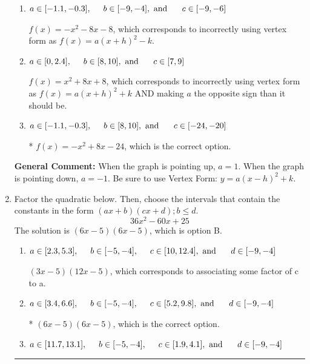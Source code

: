 \documentclass{extbook}[14pt]
\newcommand{\litem}[1]{\item #1

\rule{\textwidth}{0.4pt}}
\begin{document}
\begin{enumerate}
{\begin{enumerate}[label=\Alph*.]
$f(x)=x^{2} -8 x + 8$, which corresponds to making $a$ the opposite sign than it should be.
\item \( a \in [-1.1, -0.3], \hspace*{5mm} b \in [-9, -4], \text{ and } \hspace*{5mm} c \in [-9, -6] \)

$f(x)=-x^{2} -8 x -8$, which corresponds to incorrectly using vertex form as $f(x) = a(x+h)^2 - k$.
\item \( a \in [0, 2.4], \hspace*{5mm} b \in [8, 10], \text{ and } \hspace*{5mm} c \in [7, 9] \)

$f(x)=x^{2} +8 x + 8$, which corresponds to incorrectly using vertex form as $f(x) = a(x+h)^2+k$ AND making $a$ the opposite sign than it should be.
\item \( a \in [-1.1, -0.3], \hspace*{5mm} b \in [8, 10], \text{ and } \hspace*{5mm} c \in [-24, -20] \)

* $f(x)=-x^{2} +8 x -24$, which is the correct option.
\end{enumerate}

\textbf{General Comment:} When the graph is pointing up, $a=1$. When the graph is pointing down, $a=-1$. Be sure to use Vertex Form: $y = a(x-h)^2+k$.
}
\litem{
Factor the quadratic below. Then, choose the intervals that contain the constants in the form $(ax+b)(cx+d); b \leq d.$
\[ 36x^{2} -60 x + 25 \]The solution is \( (6x -5)(6x -5) \), which is option B.\begin{enumerate}[label=\Alph*.]
\item \( a \in [2.3, 5.3], \hspace*{5mm} b \in [-5, -4], \hspace*{5mm} c \in [10, 12.4], \text{ and } \hspace*{5mm} d \in [-9, -4] \)

 $(3x -5)(12x -5)$, which corresponds to associating some factor of c to a.
\item \( a \in [3.4, 6.6], \hspace*{5mm} b \in [-5, -4], \hspace*{5mm} c \in [5.2, 9.8], \text{ and } \hspace*{5mm} d \in [-9, -4] \)

* $(6x -5)(6x -5)$, which is the correct option.
\item \( a \in [11.7, 13.1], \hspace*{5mm} b \in [-5, -4], \hspace*{5mm} c \in [1.9, 4.1], \text{ and } \hspace*{5mm} d \in [-9, -4] \)


\end{enumerate}}
\end{enumerate}
\end{document}
